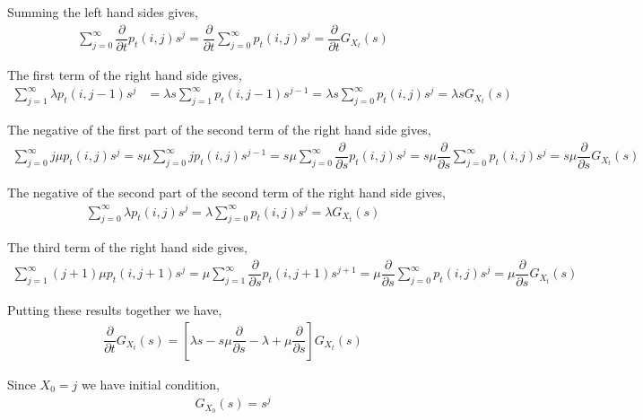 \documentclass[10pt]{article}
\begin{document}
\begin{solution}[Solution]
Summing the left hand sides gives,
\begin{align*}
    \sum_{j=0}^{\infty} \dfrac{\partial}{\partial t} p_t(i,j)s^j
    = \dfrac{\partial}{\partial t} \sum_{j=0}^{\infty} p_t(i,j)s^j
    = \dfrac{\partial}{\partial t} G_{X_t}(s)
\end{align*}

The first term of the right hand side gives,
\begin{align*}
    \sum_{j=1}^{\infty}\lambda p_t(i,j-1)s^j 
    &= \lambda s \sum_{j=1}^{\infty} p_t(i,j-1)s^{j-1}
    = \lambda s \sum_{j=0}^{\infty} p_t(i,j)s^j
    = \lambda s G_{X_t}(s)
\end{align*}

The negative of the first part of the second term of the right hand side gives,
\begin{align*}
    \sum_{j=0}^{\infty} j\mu p_t(i,j)s^j
    = s\mu  \sum_{j=0}^{\infty} j p_t(i,j)s^{j-1}
    = s\mu \sum_{j=0}^{\infty} \dfrac{\partial}{\partial s} p_t(i,j) s^{j}
    = s\mu \dfrac{\partial}{\partial s} \sum_{j=0}^{\infty} p_t(i,j) s^{j}
    = s\mu \dfrac{\partial}{\partial s} G_{X_t}(s)
\end{align*}

The negative of the second part of the second term of the right hand side gives,
\begin{align*}
    \sum_{j=0}^{\infty} \lambda p_t(i,j)s^{j}
    = \lambda \sum_{j=0}^{\infty} p_t(i,j) s^{j}
    = \lambda G_{X_t}(s)
\end{align*}

The third term of the right hand side gives,
\begin{align*}
    \sum_{j=1}^{\infty} (j+1)\mu p_t(i,j+1) s^{j}
    = \mu \sum_{j=1}^{\infty} \dfrac{\partial}{\partial s} p_t(i,j+1) s^{j+1} 
    = \mu \dfrac{\partial}{\partial s} \sum_{j=0}^{\infty} p_t(i,j)s^j
    = \mu \dfrac{\partial}{\partial s}G_{X_t}(s)
\end{align*}

Putting these results together we have,
\begin{align*}
    \dfrac{\partial}{\partial t} G_{X_t}(s)
    = \left[ \lambda s - s\mu \dfrac{\partial}{\partial s} - \lambda + \mu \dfrac{\partial}{\partial s} \right] G_{X_t}(s) 
\end{align*}

Since \( X_0 = j \) we have initial condition, 
\begin{align*}
    G_{X_0}(s) = s^j
\end{align*}


\end{solution}
\end{document}
